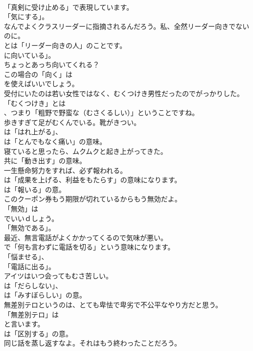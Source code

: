 \documentclass[8pt]{extreport}
\begin{document}
\begin{CJK}{UTF8}{min}
\\	「真剣に受け止める」で表現しています。
\\	「気にする」。	
\\	なんでよくクラスリーダーに指摘されるんだろう。私、全然リーダー向きでないのに。 
\\	とは「リーダー向きの人」のことです。
\\	に向いている」。	
\\	ちょっとあっち向いてくれる？ 
\\	この場合の「向く」は 
\\	を使えばいいでしょう。	
\\	受付にいたのは若い女性ではなく、むくつけき男性だったのでがっかりした。 
\\	「むくつけき」とは
\\	、つまり「粗野で野蛮な（むさくるしい）」ということですね。	
\\	歩きすぎて足がむくんでいる。靴がきつい。 
\\	は「はれ上がる」、
\\	は「とんでもなく痛い」の意味。	
\\	寝ていると思ったら、ムクムクと起き上がってきた。 
\\	共に「動き出す」の意味。	
\\	一生懸命努力をすれば、必ず報われる。 
\\	は「成果を上げる、利益をもたらす」の意味になります。
\\	は「報いる」の意。	
\\	このクーポン券もう期限が切れているからもう無効だよ。 
\\	「無効」は
\\	でいいｄしょう。
\\	「無効である」。	
\\	最近、無言電話がよくかかってくるので気味が悪い。 
\\	で「何も言わずに電話を切る」という意味になります。
\\	「悩ませる」、
\\	「電話に出る」。	
\\	アイツはいつ会ってもむさ苦しい。 
\\	は「だらしない」、
\\	は「みすぼらしい」の意。	
\\	無差別テロというのは、とても卑怯で卑劣で不公平なやり方だと思う。 
\\	「無差別テロ」は 
\\	と言います。
\\	は「区別する」の意。	
\\	同じ話を蒸し返すなよ。それはもう終わったことだろう。 

\end{CJK}
\end{document}
